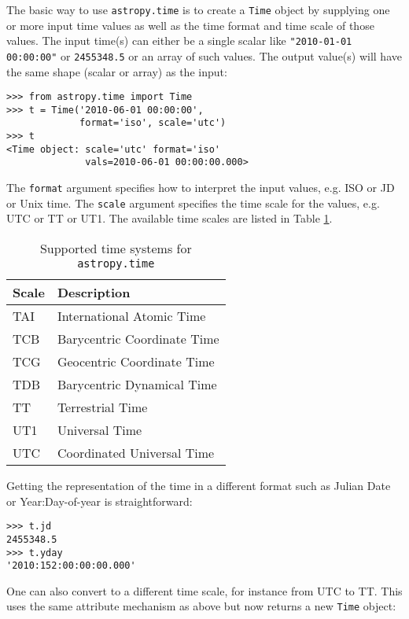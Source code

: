 \documentclass[traditabstract]{aa}
\begin{document}
The basic way to use \texttt{astropy.time} is to create a \texttt{Time} object
by supplying one or more input time values as well as the time format and time
scale of those values.  The input time(s) can either be a single scalar like
\verb|"2010-01-01 00:00:00"| or \verb|2455348.5| or an array of such values.
The output value(s) will have the same shape (scalar or array) as the input:

\begin{verbatim}
>>> from astropy.time import Time
>>> t = Time('2010-06-01 00:00:00',
             format='iso', scale='utc')
>>> t
<Time object: scale='utc' format='iso'
              vals=2010-06-01 00:00:00.000>

\end{verbatim}

The \texttt{format} argument specifies how to interpret the input values, e.g. ISO
or JD or Unix time.  The \texttt{scale} argument specifies the time scale for the
values, e.g. UTC or TT or UT1.  The available time scales are listed in Table \ref{tab:time_systems}.

\begin{table}
\caption{Supported time systems for \texttt{astropy.time}\label{tab:time_systems}}
\center
\begin{tabular}{ll}
\hline
Scale  & Description \\
\hline
TAI    & International Atomic Time \\
TCB    & Barycentric Coordinate Time \\
TCG    & Geocentric Coordinate Time \\
TDB    & Barycentric Dynamical Time \\
TT     & Terrestrial Time \\
UT1    & Universal Time \\
UTC    & Coordinated Universal Time \\
\hline
\end{tabular}
\end{table}

Getting the representation of the time in a different format such as Julian
Date or Year:Day-of-year is straightforward:

\begin{verbatim}
>>> t.jd
2455348.5
>>> t.yday
'2010:152:00:00:00.000'
\end{verbatim}

One can also convert to a different time scale, for instance from UTC to
TT.  This uses the same attribute mechanism as above but now returns a new
\texttt{Time} object:
\end{document}
